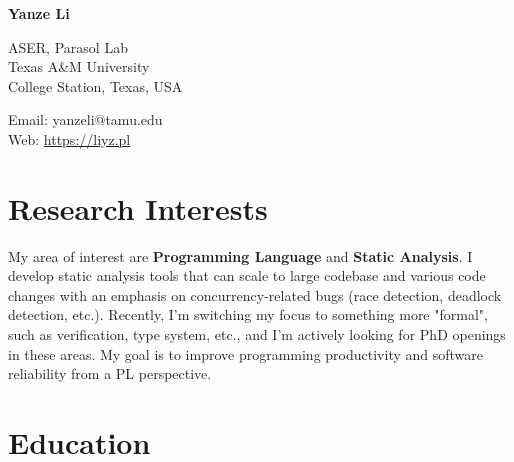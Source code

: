 \documentclass[12pt,letterpaper]{report}
\newcommand{\myname}{Yanze Li}
\newcommand{\namefont}[1]{{\normalfont\bfseries\Huge{#1}}}
\newcommand{\listitemspace}{0.15em}
\renewenvironment{itemize}
{\begin{list}{}{\setlength{\leftmargin}{0em}
			\setlength{\parskip}{0em}
			\setlength{\itemsep}{\listitemspace}
			\setlength{\parsep}{\listitemspace}}}
	{\end{list}}
\begin{document}
	\raggedright
	
	\namefont{\myname}
	
	\vspace{1em}
	\begin{minipage}[t]{0.495\textwidth}
		ASER, Parasol Lab \\
		Texas A\&M University \\
		College Station, Texas, USA
	\end{minipage}
	\begin{minipage}[t]{0.495\textwidth}
		Email: yanzeli@tamu.edu \\
		Web: \href{https://liyz.pl}{https://liyz.pl} \\
	\end{minipage}
	\vspace{0.5em}
	

	
	\section*{Research Interests}
	
	\begin{itemize}
		\item My area of interest are \textbf{Programming Language} and \textbf{Static Analysis}. 
		I develop static analysis tools that can scale to large codebase and various code changes with an emphasis on concurrency-related bugs (race detection, deadlock detection, etc.).
		Recently, I'm switching my focus to something more "formal", such as verification, type system, etc.,
		and I'm actively looking for PhD openings in these areas.
		My goal is to improve programming productivity and software reliability from a PL perspective.

	\end{itemize}


	
	\section*{Education}
	
\end{document}
